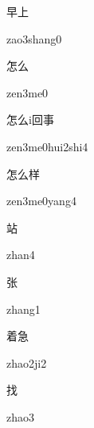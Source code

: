 \begin{verbete}{早上}
\begin{pronuncia}{zao3shang0}
\end{pronuncia}
\end{verbete}

\begin{verbete}[zen3me0]{怎么}
\begin{pronuncia}{zen3me0}
\end{pronuncia}
\end{verbete}

\begin{verbete}{怎么i回事}
\begin{pronuncia}{zen3me0hui2shi4}
\end{pronuncia}
\end{verbete}

\begin{verbete}{怎么样}
\begin{pronuncia}{zen3me0yang4}
\end{pronuncia}
\end{verbete}

\begin{verbete}[zhan4]{站}
\begin{pronuncia}{zhan4}
\end{pronuncia}
\end{verbete}

\begin{verbete}[zhang1]{张}
\begin{pronuncia}{zhang1}
\end{pronuncia}
\end{verbete}

\begin{verbete}[zhao2ji2]{着急}
\begin{pronuncia}{zhao2ji2}
\end{pronuncia}
\end{verbete}

\begin{verbete}[zhao3]{找}
\begin{pronuncia}{zhao3}
\end{pronuncia}
\end{verbete}


